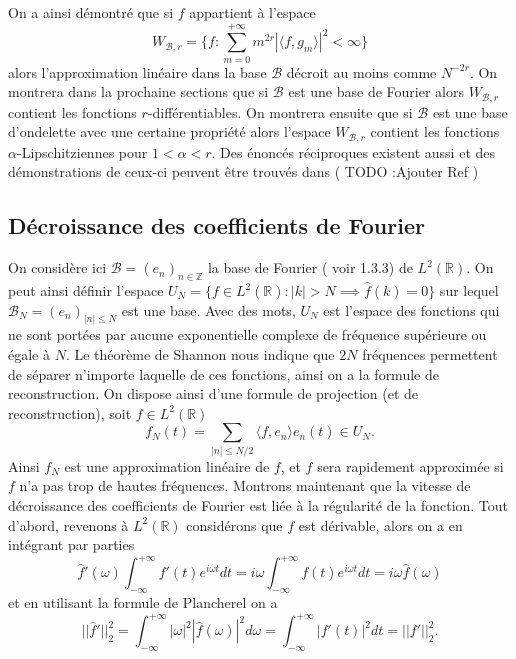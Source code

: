 On a ainsi démontré que si $f$ appartient à l'espace
\begin{equation}
	W_{\mathcal{B}, r} =\{f : \sum_{m=0}^{+\infty} m^{2r} |\langle f, g_m \rangle |^2 < \infty\}
\end{equation}
alors l'approximation linéaire dans la base $\mathcal{B}$ décroit au moins comme $N^{-2r}$.
On montrera dans la prochaine sections que si $\mathcal{B}$ est une base de Fourier alors $W_{\mathcal{B}, r}$ contient les fonctions $r$-différentiables. 
On montrera ensuite que si $\mathcal{B}$ est une base d'ondelette avec une certaine propriété alors l'espace $W_{\mathcal{B}, r}$ contient les fonctions $\alpha$-Lipschitziennes pour $1 < \alpha < r$.
Des énoncés réciproques existent aussi et des démonstrations de ceux-ci peuvent être trouvés dans ( TODO :Ajouter Ref )
\subsection{Décroissance des coefficients de Fourier}
On considère ici $\mathcal{B} = (e_{n})_{n \in \mathbb{Z}}$ la base de Fourier ( voir 1.3.3) de $L^2(\mathbb{R})$.
On peut ainsi définir l'espace $U_N = \{f \in L^2(\mathbb{R}) : |k| > N \implies \hat{f}(k) = 0\}$ sur lequel $\mathcal{B}_N = (e_{n})_{|n|\leq N}$ est une base. 
Avec des mots, $U_N$ est l'espace des fonctions qui ne sont portées par aucune exponentielle complexe de fréquence supérieure ou égale à $N$.
Le théorème de Shannon nous indique que $2N$ fréquences permettent de séparer n'importe laquelle de ces fonctions, ainsi on  a la formule de reconstruction.
On dispose ainsi d'une formule de projection (et de reconstruction), soit $f \in L^2(\mathbb{R})$
\begin{equation}
	f_N(t) = \sum_{|n|\leq N/2} \langle f, e_n \rangle e_n(t) \in U_N.
\end{equation}
Ainsi $f_N$ est une approximation linéaire de $f$, et $f$ sera rapidement approximée si $f$ n'a pas trop de hautes fréquences. 
Montrons maintenant que la vitesse de décroissance des coefficients de Fourier est liée à la régularité de la fonction.
Tout d'abord, revenons à $L^2(\mathbb{R})$ considérons que $f$ est dérivable, alors on a en intégrant par parties
\begin{equation}
	\hat{f}'(\omega)\int_{-\infty}^{+\infty} f'(t) e^{i \omega t} dt = i \omega \int_{-\infty}^{+\infty} f(t) e^{i\omega t} dt = i \omega \hat{f}(\omega) 
\end{equation}
et en utilisant la formule de Plancherel on a 
\begin{equation}
	||\hat{f}'||_2^2 = \int_{-\infty}^{+\infty} |\omega|^2 |\hat{f}(\omega)|^2 d\omega = \int_{-\infty}^{+\infty} |f'(t)|^2 dt = ||f'||_2^2.
\end{equation}
